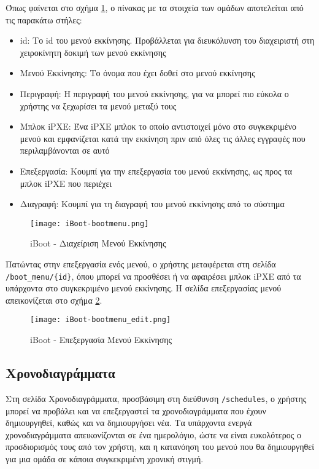Όπως φαίνεται στο σχήμα \ref{fig:iBoot_bootmenu}, ο πίνακας με τα στοιχεία των ομάδων αποτελείται από τις παρακάτω στήλες:
\begin{itemize}
	\item id: Το id του μενού εκκίνησης. Προβάλλεται για διευκόλυνση του διαχειριστή στη χειροκίνητη δοκιμή των μενού εκκίνησης
	\item Μενού Εκκίνησης: Το όνομα που έχει δοθεί στο μενού εκκίνησης
	\item Περιγραφή: Η περιγραφή του μενού εκκίνησης, για να μπορεί πιο εύκολα ο χρήστης να ξεχωρίσει τα μενού μεταξύ τους
	\item Μπλοκ iPXE: Ένα iPXE μπλοκ το οποίο αντιστοιχεί μόνο στο συγκεκριμένο μενού και εμφανίζεται κατά την εκκίνηση πριν από όλες τις άλλες εγγραφές που περιλαμβάνονται σε αυτό
	\item Επεξεργασία: Κουμπί για την επεξεργασία του μενού εκκίνησης, ως προς τα μπλοκ iPXE που περιέχει
	\item Διαγραφή: Κουμπί για τη διαγραφή του μενού εκκίνησης από το σύστημα
\end{itemize}

\begin{figure}[ht]
	\centering
	\texttt{[image: iBoot-bootmenu.png]}
	\caption{iBoot - Διαχείριση Μενού Εκκίνησης}
	\label{fig:iBoot_bootmenu}
\end{figure}

Πατώντας στην επεξεργασία ενός μενού, ο χρήστης μεταφέρεται στη σελίδα \verb!/boot_menu/{id}!, όπου μπορεί να προσθέσει ή να αφαιρέσει μπλοκ iPXE από τα υπάρχοντα στο συγκεκριμένο μενού εκκίνησης. Η σελίδα επεξεργασίας μενού απεικονίζεται στο σχήμα \ref{fig:iBoot_bootmenu_edit}.
\begin{figure}[ht]
	\centering
	\texttt{[image: iBoot-bootmenu\_edit.png]}
	\caption{iBoot - Επεξεργασία Μενού Εκκίνησης}
	\label{fig:iBoot_bootmenu_edit}
\end{figure}
\FloatBarrier

\subsection{Χρονοδιαγράμματα}
\FloatBarrier
Στη σελίδα Χρονοδιαγράμματα, προσβάσιμη στη διεύθυνση \verb!/schedules!, ο χρήστης μπορεί να προβάλει και να επεξεργαστεί τα χρονοδιαγράμματα που έχουν δημιουργηθεί, καθώς και να δημιουργήσει νέα. Τα υπάρχοντα ενεργά χρονοδιαγράμματα απεικονίζονται σε ένα ημερολόγιο, ώστε να είναι ευκολότερος ο προσδιορισμός τους από τον χρήστη, και η κατανόηση του μενού που θα δημιουργηθεί για μια ομάδα σε κάποια συγκεκριμένη χρονική στιγμή.

